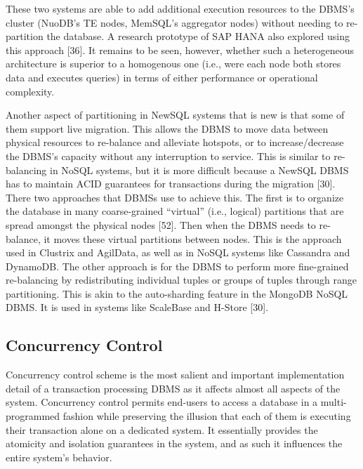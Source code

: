 \documentclass[a4paper,11pt,twoside,openright]{article}
\begin{document}
These two systems are able to add additional execution resources to the
DBMS's cluster (NuoDB's TE nodes, MemSQL's aggregator nodes) without
needing to re-partition the database. A research prototype of SAP HANA
also explored using this approach {[}36{]}. It remains to be seen,
however, whether such a heterogeneous architecture is superior to a
homogenous one (i.e., were each node both stores data and executes
queries) in terms of either performance or operational complexity.

Another aspect of partitioning in NewSQL systems that is new is that
some of them support live migration. This allows the DBMS to move data
between physical resources to re-balance and alleviate hotspots, or to
increase/decrease the DBMS's capacity without any interruption to
service. This is similar to re-balancing in NoSQL systems, but it is
more difficult because a NewSQL DBMS has to maintain ACID guarantees for
transactions during the migration {[}30{]}. There two approaches that
DBMSs use to achieve this. The first is to organize the database in many
coarse-grained ``virtual'' (i.e., logical) partitions that are spread
amongst the physical nodes {[}52{]}. Then when the DBMS needs to
re-balance, it moves these virtual partitions between nodes. This is the
approach used in Clustrix and AgilData, as well as in NoSQL systems like
Cassandra and DynamoDB. The other approach is for the DBMS to perform
more fine-grained re-balancing by redistributing individual tuples or
groups of tuples through range partitioning. This is akin to the
auto-sharding feature in the MongoDB NoSQL DBMS. It is used in systems
like ScaleBase and H-Store {[}30{]}.

\hypertarget{concurrency-control}{%
\subsection{Concurrency Control}\label{concurrency-control}}

Concurrency control scheme is the most salient and important
implementation detail of a transaction processing DBMS as it affects
almost all aspects of the system. Concurrency control permits end-users
to access a database in a multi-programmed fashion while preserving the
illusion that each of them is executing their transaction alone on a
dedicated system. It essentially provides the atomicity and isolation
guarantees in the system, and as such it influences the entire system's
behavior.
\end{document}

